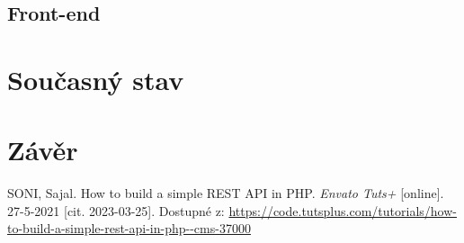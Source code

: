 \documentclass[titlepage]{article}
\begin{document}
\subsection{Front-end}

\section{Současný stav}

\section*{Závěr}

\begin{thebibliography}{9}
    SONI, Sajal. How to build a simple REST API in PHP. \emph{En\-va\-to Tuts+} [on\-li\-ne]. 27-5-2021 [cit. 2023-03-25]. Dostupné z: \url{https://code.tutsplus.com/tutorials/how-to-build-a-simple-rest-api-in-php--cms-37000}
\end{thebibliography}
\end{document}
